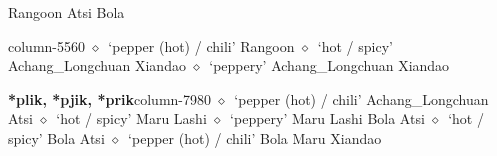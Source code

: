          Rangoon 
\hspace{1ex}
         Atsi 
\hspace{1ex}
         Bola 
  \item {\footnotesize \textbf{}}{\tiny column-5560}
         $\diamond$~`pepper (hot) / chili'
         Rangoon 
\hspace{1ex}
         $\diamond$~`hot / spicy'
         Achang\_Longchuan 
\hspace{1ex}
         Xiandao 
\hspace{1ex}
         $\diamond$~`peppery'
         Achang\_Longchuan 
\hspace{1ex}
         Xiandao 
  \item {\footnotesize \textbf{*plik, *pjik, *prik}}{\tiny column-7980}
         $\diamond$~`pepper (hot) / chili'
         Achang\_Longchuan 
\hspace{1ex}
         Atsi 
\hspace{1ex}
         $\diamond$~`hot / spicy'
         Maru 
\hspace{1ex}
         Lashi 
\hspace{1ex}
         $\diamond$~`peppery'
         Maru 
\hspace{1ex}
         Lashi 
\hspace{1ex}
         Bola 
\hspace{1ex}
         Atsi 
\hspace{1ex}
         $\diamond$~`hot / spicy'
         Bola 
\hspace{1ex}
         Atsi 
\hspace{1ex}
         $\diamond$~`pepper (hot) / chili'
         Bola 
\hspace{1ex}
         Maru 
\hspace{1ex}
         Xiandao 

